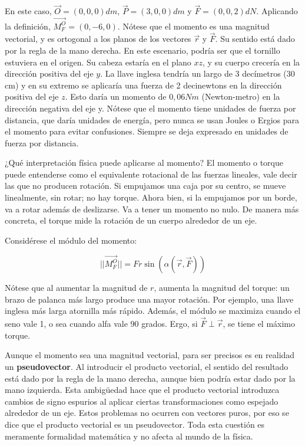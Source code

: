 \documentclass{article}
\begin{document}
En este caso, $\overrightarrow{O} = (0, 0, 0) dm$, $\overrightarrow{P} = (3, 0, 0) dm$ y $\overrightarrow{F} = (0, 0, 2) dN$. Aplicando la definición, $\overrightarrow{M_{F}^{O}} = (0, -6, 0)$. Nótese que el momento es una magnitud vectorial, y es ortogonal a los planos de los vectores $\overrightarrow{r}$ y $\overrightarrow{F}$. Su sentido está dado por la regla de la mano derecha. En este escenario, podría ser que el tornillo estuviera en el origen. Su cabeza estaría en el plano $xz$, y su cuerpo crecería en la dirección positiva del eje $y$. La llave inglesa tendría un largo de 3 decímetros (30 cm) y en su extremo se aplicaría una fuerza de 2 decinewtons en la dirección positiva del eje $z$. Esto daría un momento de $0,06 N m$ (Newton-metro) en la dirección negativa del eje y. Nótese que el momento tiene unidades de fuerza por distancia, que daría unidades de energía, pero nunca se usan Joules o Ergios para el momento para evitar confusiones. Siempre se deja expresado en unidades de fuerza por distancia.

¿Qué interpretación física puede aplicarse al momento? El momento o torque puede entenderse como el equivalente rotacional de las fuerzas lineales, vale decir las que no producen rotación. Si empujamos una caja por su centro, se mueve linealmente, sin rotar; no hay torque. Ahora bien, si la empujamos por un borde, va a rotar además de deslizarse. Va a tener un momento no nulo. De manera más concreta, el torque mide la rotación de un cuerpo alrededor de un eje.

Considérese el módulo del momento:

\begin{equation}
|| \overrightarrow{M_{F}^{O}} || = F r \sin(\alpha(\overrightarrow{r}, \overrightarrow{F}))
\end{equation}

Nótese que al aumentar la magnitud de $r$, aumenta la magnitud del torque: un brazo de palanca más largo produce una mayor rotación. Por ejemplo, una llave inglesa más larga atornilla más rápido. Además, el módulo se maximiza cuando el seno vale 1, o sea cuando alfa vale 90 grados. Ergo, si $\overrightarrow{F} \perp \overrightarrow{r}$, se tiene el máximo torque.

Aunque el momento sea una magnitud vectorial, para ser precisos es en realidad un \textbf{pseudovector}. Al introducir el producto vectorial, el sentido del resultado está dado por la regla de la mano derecha, aunque bien podría estar dado por la mano izquierda. Esta ambigüedad hace que el producto vectorial introduzca cambios de signo espurios al aplicar ciertas transformaciones como espejado alrededor de un eje. Estos problemas no ocurren con vectores puros, por eso se dice que el producto vectorial es un pseudovector. Toda esta cuestión es meramente formalidad matemática y no afecta al mundo de la física.
\end{document}
